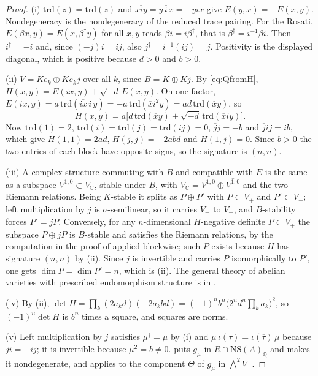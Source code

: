 \documentclass[11pt,reqno]{amsart}
\theoremstyle{plain}
\theoremstyle{definition}
\theoremstyle{remark}
\newcommand{\QQ}{\mathbb{Q}}
\newcommand{\CC}{\mathbb{C}}
\newcommand{\NS}{\mathrm{NS}}
\newcommand{\bbar}[1]{\overline{#1}}
\begin{document}
\begin{proof}
(i) $\mathrm{trd}(z)=\mathrm{trd}(\bbar{z})$ and
$\overline{\bbar{x}iy}=\bbar{y}\,\bbar{i}\,x=-\bbar{y}ix$ give
$E(y,x)=-E(x,y)$. Nondegeneracy is the nondegeneracy of the reduced trace
pairing. For the Rosati, $E(\beta x,y)=E(x,\beta^{\dagger}y)$ for all $x,y$
reads $\bbar{\beta}i=i\beta^{\dagger}$, that is
$\beta^{\dagger}=i^{-1}\bbar{\beta}i$. Then $i^{\dagger}=-i$ and, since
$(-j)i=ij$, also $j^{\dagger}=i^{-1}(ij)=j$. Positivity is the displayed
diagonal, which is positive because $d>0$ and $b>0$.

(ii) $V=Ke_{k}\oplus Ke_{k}j$ over all $k$, since $B=K\oplus Kj$. By
\eqref{eq:QfromH}, $H(x,y)=E(ix,y)+\sqrt{-d}\,E(x,y)$. On one factor,
$E(ix,y)=a\,\mathrm{trd}(\overline{ix}\,i\,y)=-a\,\mathrm{trd}(\bbar{x}i^{2}y)
=ad\,\mathrm{trd}(\bbar{x}y)$, so
\[
  H(x,y)=a\bigl[d\,\mathrm{trd}(\bbar{x}y)+\sqrt{-d}\,\mathrm{trd}(\bbar{x}iy)\bigr].
\]
Now $\mathrm{trd}(1)=2$, $\mathrm{trd}(i)=\mathrm{trd}(j)=\mathrm{trd}(ij)=0$,
$\bbar{j}j=-b$ and $\bbar{j}ij=ib$, which give $H(1,1)=2ad$,
$H(j,j)=-2abd$ and $H(1,j)=0$. Since $b>0$ the two entries of each block have
opposite signs, so the signature is $(n,n)$.

(iii) A complex structure commuting with $B$ and compatible with $E$ is the
same as a subspace $V^{1,0}\subset V_{\CC}$, stable under $B$, with
$V_{\CC}=V^{1,0}\oplus\overline{V^{1,0}}$ and the two Riemann relations. Being
$K$-stable it splits as $P\oplus P'$ with $P\subset V_{+}$ and
$P'\subset V_{-}$; left multiplication by $j$ is $\sigma$-semilinear, so it
carries $V_{+}$ to $V_{-}$, and $B$-stability forces $P'=jP$. Conversely, for
any $n$-dimensional $H$-negative definite $P\subset V_{+}$ the subspace
$P\oplus jP$ is $B$-stable and satisfies the Riemann relations, by the
computation in the proof of  applied blockwise; such $P$
exists because $H$ has signature $(n,n)$ by (ii). Since $j$ is invertible and
carries $P$ isomorphically to $P'$, one gets $\dim P=\dim P'=n$, which is
(ii). The general theory of abelian varieties with
prescribed endomorphism structure is in \cite[Ch.~9]{BL04}.

(iv) By (ii), $\det H=\prod_{k}(2a_{k}d)(-2a_{k}bd)=(-1)^{n}b^{n}\bigl(2^{n}d^{n}
\prod_{k}a_{k}\bigr)^{2}$, so $(-1)^{n}\det H$ is $b^{n}$ times a square, and
squares are norms.

(v) Left multiplication by $j$ satisfies $\mu^{\dagger}=\mu$ by (i) and
$\mu\,\iota(\tau)=\iota(\bbar{\tau})\,\mu$ because $ji=-ij$; it is invertible
because $\mu^{2}=b\ne0$.  puts $g_{\mu}$ in
$R\cap\NS(A)_{\QQ}$ and makes it nondegenerate, and
 applies to the component $\Theta$ of $g_{\mu}$ in
$\bigwedge^{2}V_{-}$.
\end{proof}
\end{document}
